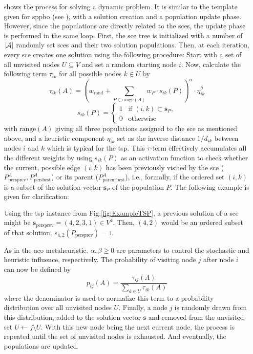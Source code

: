  shows the process for solving a dynamic problem. It is similar to the template given for \gls{sppbo} (see ), with a solution creation and a population update phase. However, since the populations are directly related to the \glspl{sce}, the update phase is performed in the same loop.
First, the \gls{sce} tree is initialized with a number of $\left\lvert\mathcal{A}\right\rvert$ randomly set \glspl{sce} and their two solution populations.
Then, at each iteration, every \gls{sce} creates one solution using the following procedure: Start with a set of all unvisited nodes $U \subseteq V$ and set a random starting node $i$. Now, calculate the following term $\tau_{ik}$ for all possible nodes $k \in U$ by
\begin{equation}
	\label{eq:hsppbo_tau}
	\tau_{ik}(A) = \left(  w_{\text{rand}} + \sum_{P\in \text{range}(A)} w_P \cdot s_{ik}(P)  \right)^\alpha \cdot \eta^\beta_{ik}
\end{equation}
\begin{equation*}
	s_{ik}(P) = \begin{cases}
		1 & \text{if $(i,k) \subset \mathbf{s}_P$},\\
		0 & \text{otherwise}
	\end{cases}
\end{equation*}
with $\text{range}(A)$ giving all three populations assigned to the \gls{sce} as mentioned above, and a heuristic component $\eta_{ik}$ set as the inverse distance $1 / d_{ik}$ between nodes $i$ and $k$ which is typical for the \gls{tsp}. This $\tau$-term effectively accumulates all the different weights by using $s_{ik}(P)$ as an activation function to check whether the current, possible edge $(i,k)$ has been previously visited by the \gls{sce} ($P^{A}_{\text{persprev}}, P^{A}_{\text{persbest}}$) or its parent ($P^{A}_{\text{parentbest}}$), i.e., formally, if the ordered set $(i,k)$ is a subset of the solution vector $\mathbf{s}_P$ of the population $P$. The following example is given for clarification:
\begin{example}
	\label{ex:subset}
Using the \gls{tsp} instance from Fig.\ref{fig:ExampleTSP}, a previous solution of a \gls{sce} might be $\mathbf{s}_\text{persprev} = (4,2,3,1) \in V^4$. Then, $(4,2)$ would be an ordered subset of that solution, $s_{4,2}(P_\text{persprev}) = 1$.
\end{example}
As in the \gls{aco} metaheuristic, $\alpha, \beta \geq 0$ are parameters to control the stochastic and heuristic influence, respectively. 
The probability of visiting node $j$ after node $i$ can now be defined by
\begin{equation}
	\label{eq:hsppbo_prob}
	p_{ij}(A) = \frac{\tau_{ij}(A)}{\sum_{k \in U} \tau_{ik}(A)}
\end{equation}
where the denominator is used to normalize this term to a probability distribution over all unvisited nodes $U$. Finally, a node $j$ is randomly drawn from this distribution, added to the solution vector $\mathbf{s}$ and removed from the unvisited set $U \gets {j}\setminus U$. With this new node being the next current node, the process is repeated until the set of unvisited nodes is exhausted. And eventually, the populations are updated.

